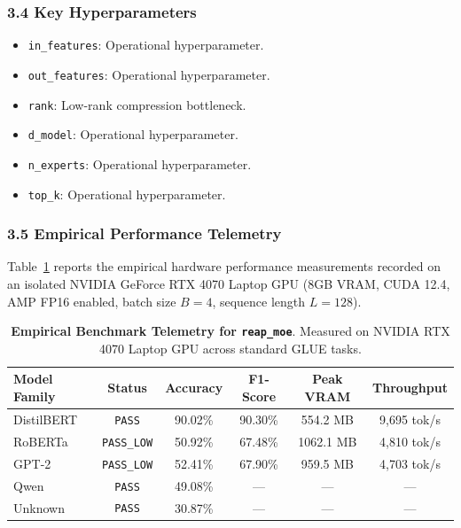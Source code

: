 \subsubsection*{3.4 Key Hyperparameters}
\begin{itemize}
    \item \texttt{in\_features}: Operational hyperparameter.
    \item \texttt{out\_features}: Operational hyperparameter.
    \item \texttt{rank}: Low-rank compression bottleneck.
    \item \texttt{d\_model}: Operational hyperparameter.
    \item \texttt{n\_experts}: Operational hyperparameter.
    \item \texttt{top\_k}: Operational hyperparameter.
\end{itemize}

\subsubsection*{3.5 Empirical Performance Telemetry}
Table~\ref{tab:telemetry_reap_moe} reports the empirical hardware performance measurements recorded on an isolated NVIDIA GeForce RTX 4070 Laptop GPU (8GB VRAM, CUDA 12.4, AMP FP16 enabled, batch size $B=4$, sequence length $L=128$).

\begin{table}[h]
\centering
\small
\caption{\textbf{Empirical Benchmark Telemetry for \texttt{reap\_moe}}. Measured on NVIDIA RTX 4070 Laptop GPU across standard GLUE tasks.}
\label{tab:telemetry_reap_moe}
\begin{tabular*}{\columnwidth}{@{\extracolsep{\fill}}lccccc}
\toprule
\textbf{Model Family} & \textbf{Status} & \textbf{Accuracy} & \textbf{F1-Score} & \textbf{Peak VRAM} & \textbf{Throughput} \\
\midrule
DistilBERT & \texttt{PASS} & 90.02\% & 90.30\% & 554.2 MB & 9,695 tok/s \\
RoBERTa & \texttt{PASS\_LOW} & 50.92\% & 67.48\% & 1062.1 MB & 4,810 tok/s \\
GPT-2 & \texttt{PASS\_LOW} & 52.41\% & 67.90\% & 959.5 MB & 4,703 tok/s \\
Qwen & \texttt{PASS} & 49.08\% & --- & --- & --- \\
Unknown & \texttt{PASS} & 30.87\% & --- & --- & --- \\
\bottomrule
\end{tabular*}
\end{table}

